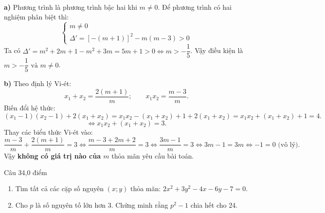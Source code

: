 \begin{loi_giai_cau}
\textbf{a)} Phương trình là phương trình bậc hai khi $m \neq 0$.
Để phương trình có hai nghiệm phân biệt thì:
\[\begin{cases} m \neq 0 \\ \Delta' = [-(m+1)]^2 - m(m-3) > 0 \end{cases}\]
Ta có $\Delta' = m^2 + 2m + 1 - m^2 + 3m = 5m + 1 > 0 \iff m > -\dfrac{1}{5}$.
Vậy điều kiện là $\boxed{m > -\dfrac{1}{5}\text{ và }m \neq 0}$.

\textbf{b)} Theo định lý Vi-ét:
\[x_1 + x_2 = \frac{2(m+1)}{m};\qquad x_1 x_2 = \frac{m-3}{m}.\]
Biến đổi hệ thức:
\[(x_1-1)(x_2-1) + 2(x_1+x_2) = x_1 x_2 - (x_1+x_2) + 1 + 2(x_1+x_2) = x_1 x_2 + (x_1+x_2) + 1 = 4.\]
\[\iff x_1 x_2 + (x_1+x_2) = 3.\]
Thay các biểu thức Vi-ét vào:
\[\frac{m-3}{m} + \frac{2(m+1)}{m} = 3 \iff \frac{m-3 + 2m + 2}{m} = 3 \iff \frac{3m - 1}{m} = 3 \iff 3m - 1 = 3m \iff -1 = 0\text{ (vô lý)}.\]
Vậy \textbf{không có giá trị nào của $m$} thỏa mãn yêu cầu bài toán.
\end{loi_giai_cau}

\begin{de_cau}{Câu 3}{4,0 điểm}
\begin{enumerate}[label=\alph*)]
\item Tìm tất cả các cặp số nguyên $(x; y)$ thỏa mãn: $2x^2 + 3y^2 - 4x - 6y - 7 = 0$.
\item Cho $p$ là số nguyên tố lớn hơn 3. Chứng minh rằng $p^2 - 1$ chia hết cho 24.
\end{enumerate}
\end{de_cau}

